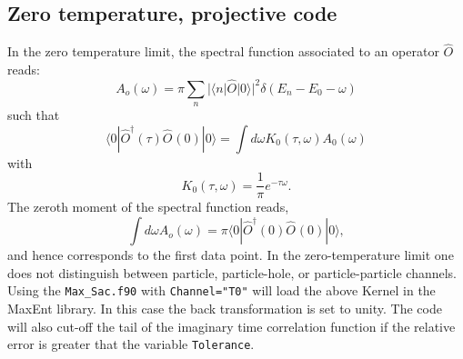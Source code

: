 \subsection{Zero temperature, projective code}

 In the zero temperature limit,  the spectral function associated to an operator $\hat{O} $    reads:
 \begin{equation}
 	  A_o(\omega)    = \pi  \sum_{n}    | \langle n  | \hat{O} | 0 \rangle |^2 \delta( E_n - E_0 - \omega) 
 \end{equation}
 such that 
 \begin{equation}
 	\langle 0 | \hat{O}^{\dagger}(\tau) \hat{O}^{}(0) | 0 \rangle =  \int d  \omega  K_0(\tau,\omega) A_0(\omega) 
 \end{equation}
 with 
 \begin{equation}
 	K_0(\tau,\omega)  = \frac{1}{\pi}e^{-\tau \omega}.
 \end{equation}
 The zeroth moment of the spectral function reads, 
 \begin{equation}
  \int d \omega A_o(\omega) = \pi \langle 0 | \hat{O}^{\dagger}(0) \hat{O}^{}(0) | 0 \rangle, 
 \end{equation}
 and hence corresponds to the first data point. 
 In the zero-temperature limit one does not distinguish between  particle, particle-hole, or particle-particle channels.
 Using the \texttt{Max\_Sac.f90}  with \texttt{Channel="T0"}   will  load the above Kernel in the MaxEnt library. In this case the back  transformation is set to unity. 
 The code will also cut-off the tail of the  imaginary time correlation function  if the relative error is greater that the variable \texttt{Tolerance}. 

